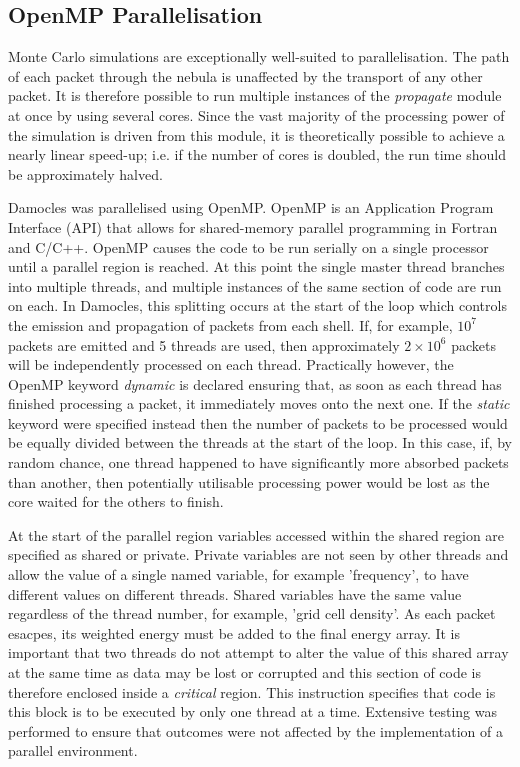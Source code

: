 			
	\subsection{OpenMP Parallelisation}	
	\label{scn:open_mp}
	
	Monte Carlo simulations are exceptionally well-suited to parallelisation.  The path of each packet through the nebula is unaffected by the transport of any other packet.  It is therefore possible to run multiple instances of the \textit{propagate} module at once by using several cores.  Since the vast majority of the processing power of the simulation is driven from this module, it is theoretically possible to achieve a nearly linear speed-up; i.e. if the number of cores is doubled, the run time should be approximately halved.  %
	
	Damocles was parallelised using OpenMP.  OpenMP is an Application Program Interface (API) that allows for shared-memory parallel programming in Fortran and C/C++.  OpenMP causes the code to be run serially on a single processor until a parallel region is reached.  At this point the single master thread branches into multiple threads, and multiple instances of the same section of code are run on each.  In Damocles, this splitting occurs at the start of the loop which controls the emission and propagation of packets from each shell.  If, for example, $10^7$ packets are emitted and 5 threads are used, then approximately $2 \times 10^6$ packets will be independently processed on each thread.  Practically however, the OpenMP keyword \textit{dynamic} is declared ensuring that, as soon as each thread has finished processing a packet, it immediately moves onto the next one.  If the \textit{static} keyword were specified instead then the number of packets to be processed would be equally divided between the threads at the start of the loop.  In this case, if, by random chance, one thread happened to have significantly more absorbed packets than another, then potentially utilisable processing power would be lost as the core waited for the others to finish.
	
	At the start of the parallel region variables accessed within the shared region are specified as shared or private.  Private variables are not seen by other threads and allow the value of a single named variable, for example 'frequency', to have different values on different threads.  Shared variables have the same value regardless of the thread number, for example, 'grid cell density'.  As each packet esacpes, its weighted energy must be added to the final energy array.  It is important that two threads do not attempt to alter the value of this shared array at the same time as data may be lost or corrupted and this section of code is therefore enclosed inside a \textit{critical} region.  This instruction specifies that code is this block is to be executed by only one thread at a time.  Extensive testing was performed to ensure that outcomes were not affected by the implementation of a parallel environment.
	

